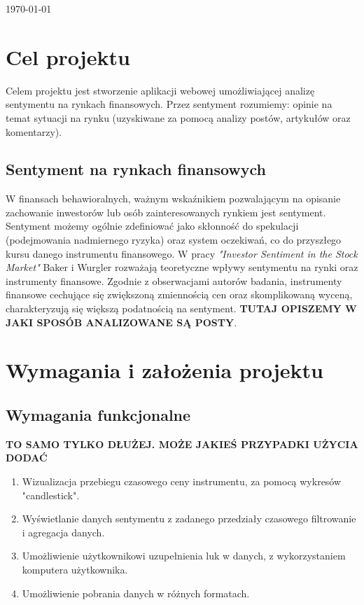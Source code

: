 \begin{titlepage}

\vspace*{\fill}

{\large \today}\\[2cm] %
\end{titlepage}
\newpage
\tableofcontents
\newpage
\section{Cel projektu}
Celem projektu jest stworzenie aplikacji webowej umożliwiającej analizę sentymentu na rynkach finansowych.
Przez sentyment rozumiemy: opinie na temat sytuacji na rynku (uzyskiwane za pomocą analizy postów, artykułów oraz komentarzy).
\subsection{Sentyment na rynkach finansowych}
W finansach behawioralnych, ważnym wskaźnikiem pozwalającym na opisanie zachowanie inwestorów lub osób zainteresowanych rynkiem jest sentyment. Sentyment możemy ogólnie zdefiniować jako skłonność do spekulacji (podejmowania nadmiernego ryzyka) oraz system oczekiwań, co do przyszłego kursu danego instrumentu finansowego. W pracy \textit{"Investor Sentiment in the Stock Market"} Baker i Wurgler rozważają teoretyczne wpływy sentymentu na rynki oraz instrumenty finansowe. Zgodnie z obserwacjami autorów badania, instrumenty finansowe cechujące się zwiększoną zmiennością cen oraz skomplikowaną wyceną, charakteryzują się większą podatnością na sentyment. \textbf{TUTAJ OPISZEMY W JAKI SPOSÓB ANALIZOWANE SĄ POSTY}. 
\section{Wymagania i założenia projektu}
\subsection{Wymagania funkcjonalne}
\textbf{TO SAMO TYLKO DŁUŻEJ. MOŻE JAKIEŚ PRZYPADKI UŻYCIA DODAĆ}
\begin{enumerate}
  \item {Wizualizacja przebiegu czasowego ceny instrumentu, za pomocą wykresów "candlestick".}
  \item {Wyświetlanie danych sentymentu z zadanego przedziały czasowego filtrowanie i agregacja danych.}
  \item {Umożliwienie użytkownikowi uzupełnienia luk w danych, z wykorzystaniem komputera użytkownika.}
  \item {Umożliwienie pobrania danych w różnych formatach.}
\end{enumerate}

